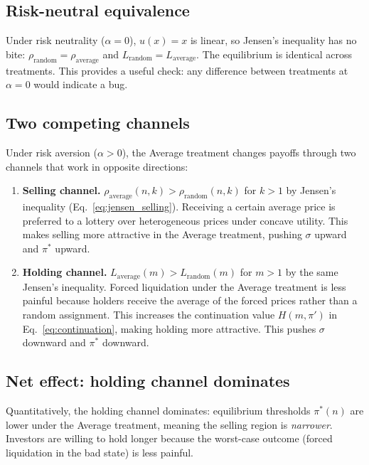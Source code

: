 \documentclass[11pt]{article}
\begin{document}
\subsection{Risk-neutral equivalence}

Under risk neutrality ($\alpha = 0$), $u(x) = x$ is linear, so Jensen's
inequality has no bite:
$\rho_{\text{random}} = \rho_{\text{average}}$ and
$L_{\text{random}} = L_{\text{average}}$. The equilibrium is identical across
treatments. This provides a useful check: any difference between treatments
at $\alpha = 0$ would indicate a bug.

\subsection{Two competing channels}

Under risk aversion ($\alpha > 0$), the Average treatment changes payoffs
through two channels that work in opposite directions:

\begin{enumerate}
    \item \textbf{Selling channel.} $\rho_{\text{average}}(n,k) >
    \rho_{\text{random}}(n,k)$ for $k > 1$ by Jensen's inequality
    (Eq.~\ref{eq:jensen_selling}). Receiving a certain average price is
    preferred to a lottery over heterogeneous prices under concave utility.
    This makes selling more attractive in the Average treatment, pushing
    $\sigma$ upward and $\pi^*$ upward.

    \item \textbf{Holding channel.} $L_{\text{average}}(m) >
    L_{\text{random}}(m)$ for $m > 1$ by the same Jensen's inequality.
    Forced liquidation under the Average treatment is less painful because
    holders receive the average of the forced prices rather than a random
    assignment. This increases the continuation value $H(m, \pi')$ in
    Eq.~\eqref{eq:continuation}, making holding more attractive. This pushes
    $\sigma$ downward and $\pi^*$ downward.
\end{enumerate}

\subsection{Net effect: holding channel dominates}

Quantitatively, the holding channel dominates: equilibrium thresholds
$\pi^*(n)$ are lower under the Average treatment, meaning the selling region
is \textit{narrower}. Investors are willing to hold longer because the
worst-case outcome (forced liquidation in the bad state) is less painful.
\end{document}
